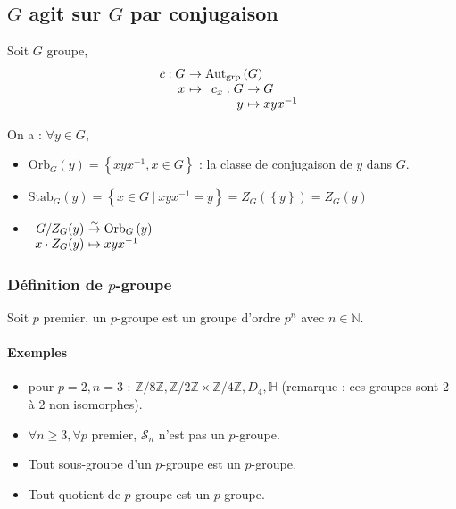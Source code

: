 \documentclass[a4paper,10pt]{report}
\newcommand{\set}[1]{\left\lbrace #1 \right\rbrace } %
\newcommand{\IZ}{\mathbb{Z}} %
\newcommand{\IN}{\mathbb{N}} %
\newcommand{\bij}{\overset{\sim}{\to}} %
\newcommand{\Autgrp}[1]{\text{Aut}_{\text{grp}}\left(#1\right)}
\newcommand{\Orb}[2]{\text{Orb}_{#1}\left( #2 \right)}
\newcommand{\Stab}[2]{\text{Stab}_{#1}\left( #2 \right)}
\newcommand{\such}{\ \Big| \ }
\begin{document}
   \subsection{$G$ agit sur $G$ par conjugaison}
    Soit $G$ groupe, 
    $$\begin{array}[t]{r@{\ }l}
      c : G &\to \Autgrp{G}\\
      x &\mapsto 
      \begin{array}[t]{r@{\ }l}
	c_x : G &\to G\\
	y &\mapsto xyx^{-1}
      \end{array}
    \end{array}$$

    On a : $\forall y \in G$, 
    \begin{itemize}
      \item $\Orb{G}{y} = \set{xyx^{-1}, x \in G}$ : la classe de conjugaison de
	$y$ dans $G$.
      \item $\Stab{G}{y} = \set{x \in G \such xyx^{-1} = y} =
	Z_G(\set{y})=Z_G(y)$
      \item $
	\begin{array}[t]{r@{\ }l}
	  G/Z_G(y) &\bij \Orb{G}{y}\\
	  x \cdot Z_G(y) &\mapsto xyx^{-1}
	\end{array}$	
    \end{itemize}

    \subsubsection{Définition de $p$-groupe}
     Soit $p$ premier, un $p$-groupe est un groupe d'ordre $p^n$ avec
     $n \in \IN$.

     \paragraph{Exemples}
     \begin{itemize}
       \item pour $p=2, n=3$ : $\IZ/8\IZ, \IZ/2\IZ \times \IZ/4\IZ, D_4,
 	\mathbb{H}$ (remarque : ces groupes sont 2 à 2 non isomorphes).
       \item $\forall n \geq 3, \forall p$ premier, $\mathcal{S}_n$ n'est pas
	 un $p$-groupe.
       \item Tout sous-groupe d'un $p$-groupe est un $p$-groupe.
       \item Tout quotient de $p$-groupe est un $p$-groupe.	
     \end{itemize}
\end{document}
